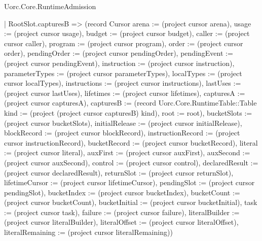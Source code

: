 \begin{lexlean}{Uorc.Core.RuntimeAdmission}
\begin{semanticmodule}
{    | RootSlot.capturesB => (record Cursor {arena := (project cursor arena), usage := (project cursor usage), budget := (project cursor budget), caller := (project cursor caller), program := (project cursor program), order := (project cursor order), pendingOrder := (project cursor pendingOrder), pendingEvent := (project cursor pendingEvent), instruction := (project cursor instruction), parameterTypes := (project cursor parameterTypes), localTypes := (project cursor localTypes), instructions := (project cursor instructions), lastUses := (project cursor lastUses), lifetimes := (project cursor lifetimes), capturesA := (project cursor capturesA), capturesB := (record Uorc.Core.RuntimeTable::Table {kind := (project (project cursor capturesB) kind), root := root}), bucketSlots := (project cursor bucketSlots), initialRelease := (project cursor initialRelease), blockRecord := (project cursor blockRecord), instructionRecord := (project cursor instructionRecord), bucketRecord := (project cursor bucketRecord), literal := (project cursor literal), auxFirst := (project cursor auxFirst), auxSecond := (project cursor auxSecond), control := (project cursor control), declaredResult := (project cursor declaredResult), returnSlot := (project cursor returnSlot), lifetimeCursor := (project cursor lifetimeCursor), pendingSlot := (project cursor pendingSlot), bucketIndex := (project cursor bucketIndex), bucketCount := (project cursor bucketCount), bucketInitial := (project cursor bucketInitial), task := (project cursor task), failure := (project cursor failure), literalBuilder := (project cursor literalBuilder), literalOffset := (project cursor literalOffset), literalRemaining := (project cursor literalRemaining)})
}
\end{semanticmodule}
\end{lexlean}
